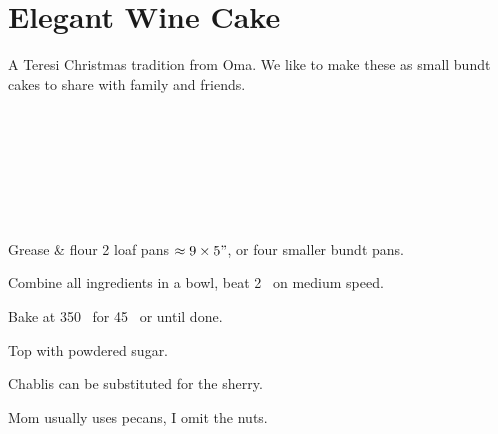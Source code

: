 \section{Elegant Wine Cake}


\begin{recipestats}[
	servings=2 loafs,
	preptime=10 \minute,
	bakingtime=45 \minute,
	source=Lucille Steinmiller (Oma),
	]
\end{recipestats}


\begin{recipeabstract}
	A Teresi Christmas tradition from Oma.
	We like to make these as small bundt cakes to share with family and friends.
\end{recipeabstract}


\begin{ingredientcolumns}[1]
	\begin{ingredientblock}
		\\
		\\
		\\
		\\
		\\
		\\
	\end{ingredientblock}
\end{ingredientcolumns}


\begin{preparation}
\item Grease \& flour 2 loaf pans $\approx 9 \times 5"$, or four smaller bundt pans.

\item Combine all ingredients in a bowl, beat 2 \minute~on medium speed.

\item Bake at 350 \Fahrenheit~for 45 \minute~or until done.

\item Top with powdered sugar.
\end{preparation}

\begin{variation}
\item Chablis can be substituted for the sherry.

\item Mom usually uses pecans, I  omit the nuts.
\end{variation}


\recipeend
